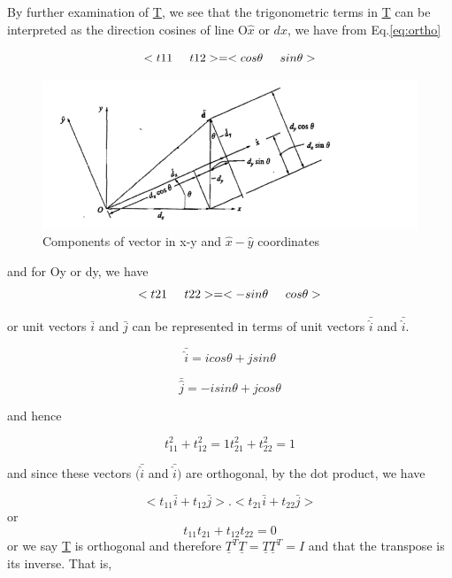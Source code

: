 \documentclass[12pt]{report}
\newcommand{\lab}[1]{
	Eq.\ref{#1}
}
\begin{document}
By further examination of \underline{T}, we see that the trigonometric terms in
\underline{T} can be interpreted as the direction cosines of line O$\hat{x}$ or
$d{x}$, we have from \lab{eq:ortho}

\begin{equation}
	<{t11}\hspace{0.5cm}{t12}>=<{cos\theta}\hspace{0.5cm}{sin\theta}>
\end{equation}

\begin{figure}
	\includegraphics[scale=0.5]{ortho.PNG}
	\caption{Components of vector in x-y and $\hat{x}-\hat{y}$ coordinates} 
	\label{fig:orthof}
\end{figure}
and for Oy or dy, we have
\begin{equation}
	<{t21}\hspace{0.5cm}{t22}>=<{-sin\theta}\hspace{0.5cm}{cos\theta}>
\end{equation}

or unit vectors $\bar{i}$ and $\bar{j}$ can be represented in terms of
unit vectors $\bar{\hat{i}}$ and $\bar{\hat{i}}$.

\begin{equation}
	\bar{\hat{i}} =icos\theta+jsin\theta
\end{equation}

\begin{equation}
	\bar{\hat{j}} =-isin\theta+jcos\theta
\end{equation}

and hence

\begin{equation}
	{t}^2_{11} + {t}^2_{12}=1 
	{t}^2_{21} + {t}^2_{22}=1
\end{equation}

and since these vectors $(\bar{\hat{i}}$ and $\bar{\hat{i}})$ are
orthogonal, by the dot product, we have


\begin{equation}
	<{t}_{11} \bar{i} + {t}_{12} \bar{j}>.<{t}_{21} \bar{i} +
	{t}_{22} \bar{j}>
\end{equation}
or 
\begin{equation}
		{t}_{11}{t}_{21} + {t}_{12} {t}_{22}=0
\end{equation}
or we say \underline{T} is orthogonal and 
therefore $\underline{T}^T\underline{T}=\underline{T}\underline{T}^T=I$ 
and that the transpose is its inverse. That is,
\end{document}
